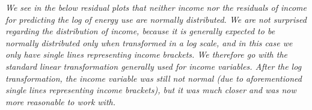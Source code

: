 \documentclass[
]{article}
\newenvironment{Shaded}{\begin{snugshade}}{\end{snugshade}}
\newcommand{\AttributeTok}[1]{\textcolor[rgb]{0.77,0.63,0.00}{#1}}
\newcommand{\DecValTok}[1]{\textcolor[rgb]{0.00,0.00,0.81}{#1}}
\newcommand{\FunctionTok}[1]{\textcolor[rgb]{0.00,0.00,0.00}{#1}}
\newcommand{\NormalTok}[1]{#1}
\newcommand{\OtherTok}[1]{\textcolor[rgb]{0.56,0.35,0.01}{#1}}
\newcommand{\SpecialCharTok}[1]{\textcolor[rgb]{0.00,0.00,0.00}{#1}}
\begin{document}
\emph{We see in the below residual plots that neither income nor the
residuals of income for predicting the log of energy use are normally
distributed. We are not surprised regarding the distribution of income,
because it is generally expected to be normally distributed only when
transformed in a log scale, and in this case we only have single lines
representing income brackets. We therefore go with the standard linear
transformation generally used for income variables. After the log
transformation, the income variable was still not normal (due to
aforementioned single lines representing income brackets), but it was
much closer and was now more reasonable to work with.}

\begin{Shaded}
\end{Shaded}
\end{document}

